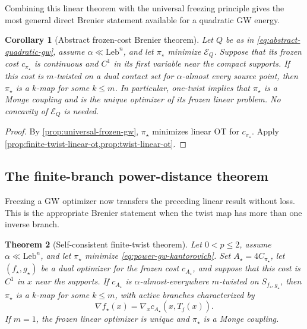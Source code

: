 \documentclass[11pt,a4paper]{article}
\newtheorem{theorem}{Theorem}[section]
\newtheorem{corollary}[theorem]{Corollary}
\theoremstyle{definition}
\theoremstyle{remark}
\newcommand{\Ecal}{\mathcal E}
\begin{document}
Combining this linear theorem with the universal freezing principle gives the
most general direct Brenier statement available for a quadratic GW energy.

\begin{corollary}[Abstract frozen-cost Brenier theorem]
\label{cor:abstract-frozen-cost-brenier}
Let \(Q\) be as in \eqref{eq:abstract-quadratic-gw}, assume
\(\alpha\ll\mathrm{Leb}^n\), and let \(\pi_\star\) minimize
\(\Ecal_Q\).  Suppose that its frozen cost \(c_{\pi_\star}\) is continuous
and \(C^1\) in its first variable near the compact supports.  If this cost is
\(m\)-twisted on a dual contact set for \(\alpha\)-almost every source
point, then \(\pi_\star\) is a \(k\)-map for some \(k\leq m\).  In
particular, one-twist implies that \(\pi_\star\) is a Monge coupling and is
the unique optimizer of its frozen linear problem.  No concavity of
\(\Ecal_Q\) is needed.
\end{corollary}

\begin{proof}
By \cref{prop:universal-frozen-gw}, \(\pi_\star\) minimizes linear OT for
\(c_{\pi_\star}\).  Apply
\cref{prop:finite-twist-linear-ot,prop:twist-linear-ot}.
\end{proof}

\subsection{The finite-branch power-distance theorem}

Freezing a GW optimizer now transfers the preceding linear result without
loss.  This is the appropriate Brenier statement when the twist map has more
than one inverse branch.

\begin{theorem}[Self-consistent finite-twist theorem]
\label{thm:rkhs-finite-twist}
Let \(0<p\leq2\), assume \(\alpha\ll\mathrm{Leb}^n\), and let
\(\pi_\star\) minimize \eqref{eq:power-gw-kantorovich}.  Set
\(A_\star=4C_{\pi_\star}\), let \((f_\star,g_\star)\) be a dual optimizer for
the frozen cost \(c_{A_\star}\), and suppose that this cost is \(C^1\) in
\(x\) near the supports.  If \(c_{A_\star}\) is
\(\alpha\)-almost-everywhere \(m\)-twisted on
\(S_{f_\star,g_\star}\), then \(\pi_\star\) is a \(k\)-map for some
\(k\leq m\), with active branches characterized by
\begin{equation}
  \nabla f_\star(x)=\nabla_xc_{A_\star}(x,T_j(x)).
  \label{eq:rkhs-finite-branch-characterization}
\end{equation}
If \(m=1\), the frozen linear optimizer is unique and \(\pi_\star\) is a
Monge coupling.
\end{theorem}
\end{document}
